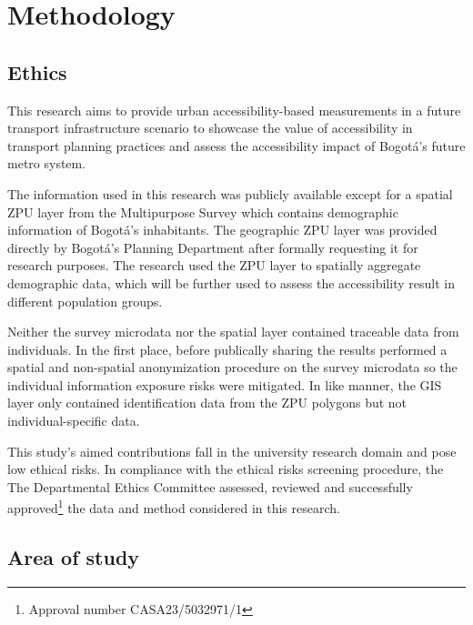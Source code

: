 \documentclass[12pt, a4paper]{report}
\begin{document}
\chapter{Methodology} \label{Chap4}


\section{Ethics}

This research aims to provide urban accessibility-based measurements in a future transport infrastructure scenario to showcase the value of accessibility in transport planning practices and assess the accessibility impact of Bogotá's future metro system.

The information used in this research was publicly available except for a spatial ZPU layer \citep{secretariadistritaldeplaneacionMicrodatosEncuestaMultiproposito2023} from the Multipurpose Survey \citep{secretariadistritaldeplaneacionCapaGeograficaEncuesta2023} which contains demographic information of Bogotá's inhabitants. The geographic ZPU layer was provided directly by Bogotá's Planning Department after formally requesting it for research purposes. The research used the ZPU layer to spatially aggregate demographic data, which will be further used to assess the accessibility result in different population groups.

Neither the survey microdata nor the spatial layer contained traceable data from individuals. In the first place, before publically sharing the results \cite{secretariadistritaldeplaneacionMicrodatosEncuestaMultiproposito2023} performed a spatial and non-spatial anonymization procedure on the survey microdata so the individual information exposure risks were mitigated. In like manner, the GIS layer only contained identification data from the ZPU polygons but not individual-specific data.

This study's aimed contributions fall in the university research domain and pose low ethical risks. In compliance with the ethical risks screening procedure, the
The Departmental Ethics Committee assessed, reviewed and successfully approved\footnote{Approval number CASA23/5032971/1} the data and method considered in this research. 

\section{Area of study}
\end{document}
